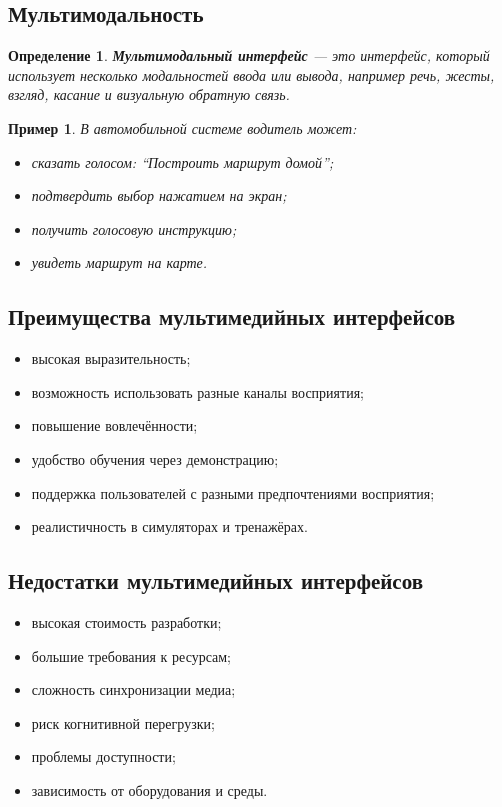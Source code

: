 \documentclass[12pt,a4paper]{article}
\newtheorem{definition}{Определение}
\newtheorem{example}{Пример}
\begin{document}
\subsection{Мультимодальность}

\begin{definition}
\textbf{Мультимодальный интерфейс} --- это интерфейс, который использует несколько модальностей ввода или вывода, например речь, жесты, взгляд, касание и визуальную обратную связь.
\end{definition}

\begin{example}
В автомобильной системе водитель может:
\begin{itemize}
    \item сказать голосом: ``Построить маршрут домой'';
    \item подтвердить выбор нажатием на экран;
    \item получить голосовую инструкцию;
    \item увидеть маршрут на карте.
\end{itemize}
\end{example}

\subsection{Преимущества мультимедийных интерфейсов}

\begin{itemize}
    \item высокая выразительность;
    \item возможность использовать разные каналы восприятия;
    \item повышение вовлечённости;
    \item удобство обучения через демонстрацию;
    \item поддержка пользователей с разными предпочтениями восприятия;
    \item реалистичность в симуляторах и тренажёрах.
\end{itemize}

\subsection{Недостатки мультимедийных интерфейсов}

\begin{itemize}
    \item высокая стоимость разработки;
    \item большие требования к ресурсам;
    \item сложность синхронизации медиа;
    \item риск когнитивной перегрузки;
    \item проблемы доступности;
    \item зависимость от оборудования и среды.
\end{itemize}
\end{document}
